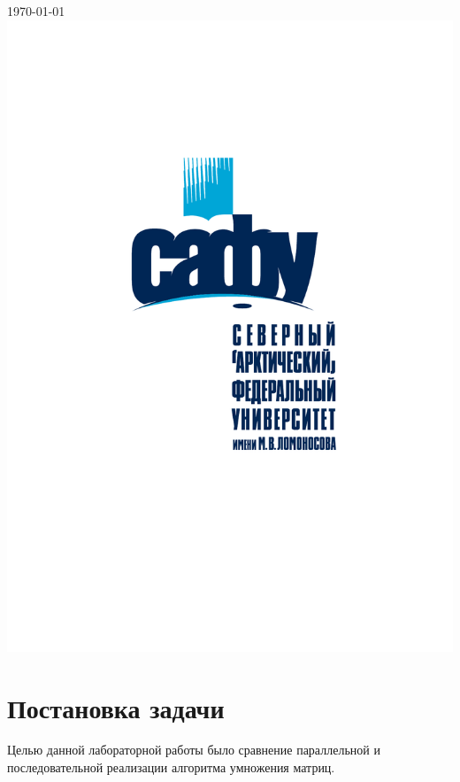 \documentclass[12pt]{article}
\begin{document}
\begin{titlepage}
{\large \today}\\[2cm] 
\includegraphics[scale=0.2]{logo.pdf} 
\vfill
\end{titlepage}


\section{Постановка задачи}
Целью данной лабораторной работы было сравнение параллельной и последовательной реализации алгоритма умножения матриц.
\end{document}
